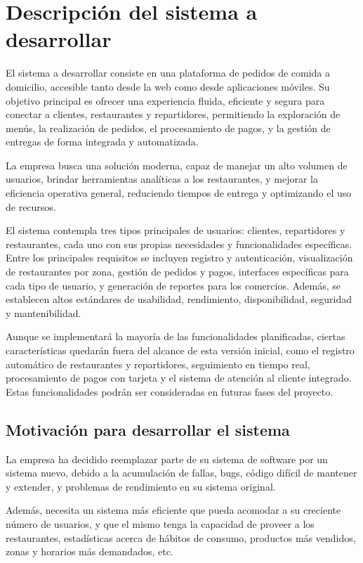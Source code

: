 
\section{Descripción del sistema a desarrollar}
El sistema a desarrollar consiste en una plataforma de pedidos de comida a domicilio, accesible tanto desde la web como desde aplicaciones móviles. Su objetivo principal es ofrecer una experiencia fluida, eficiente y segura para conectar a clientes, restaurantes y repartidores, permitiendo la exploración de menús, la realización de pedidos, el procesamiento de pagos, y la gestión de entregas de forma integrada y automatizada.

La empresa busca una solución moderna, capaz de manejar un alto volumen de usuarios, brindar herramientas analíticas a los restaurantes, y mejorar la eficiencia operativa general, reduciendo tiempos de entrega y optimizando el uso de recursos.

El sistema contempla tres tipos principales de usuarios: clientes, repartidores y restaurantes, cada uno con sus propias necesidades y funcionalidades específicas. Entre los principales requisitos se incluyen registro y autenticación, visualización de restaurantes por zona, gestión de pedidos y pagos, interfaces específicas para cada tipo de usuario, y generación de reportes para los comercios. Además, se establecen altos estándares de usabilidad, rendimiento, disponibilidad, seguridad y mantenibilidad.

Aunque se implementará la mayoría de las funcionalidades planificadas, ciertas características quedarán fuera del alcance de esta versión inicial, como el registro automático de restaurantes y repartidores, seguimiento en tiempo real, procesamiento de pagos con tarjeta y el sistema de atención al cliente integrado. Estas funcionalidades podrán ser consideradas en futuras fases del proyecto.


\subsection{Motivación para desarrollar el sistema}
La empresa ha decidido reemplazar parte de su sistema de software por un sistema nuevo, debido a la acumulación de fallas, bugs, código difícil de mantener y extender, y problemas de rendimiento en su sistema original.

Además, necesita un sistema más eficiente que pueda acomodar a su creciente número de usuarios, y que el mismo tenga la capacidad de proveer a los restaurantes, estadísticas acerca de hábitos de consumo, productos más vendidos, zonas y horarios más demandados, etc.

